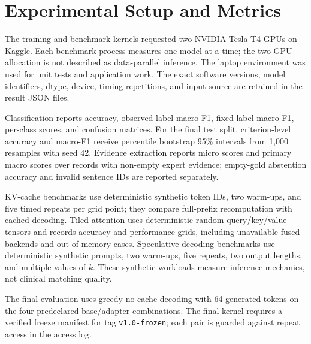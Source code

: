 \section{Experimental Setup and Metrics}
The training and benchmark kernels requested two NVIDIA Tesla T4 GPUs on Kaggle. Each benchmark process measures one model at a time; the two-GPU allocation is not described as data-parallel inference. The laptop environment was used for unit tests and application work. The exact software versions, model identifiers, dtype, device, timing repetitions, and input source are retained in the result JSON files.

Classification reports accuracy, observed-label macro-F1, fixed-label macro-F1, per-class scores, and confusion matrices. For the final test split, criterion-level accuracy and macro-F1 receive percentile bootstrap 95\% intervals from 1,000 resamples with seed 42. Evidence extraction reports micro scores and primary macro scores over records with non-empty expert evidence; empty-gold abstention accuracy and invalid sentence IDs are reported separately.

KV-cache benchmarks use deterministic synthetic token IDs, two warm-ups, and five timed repeats per grid point; they compare full-prefix recomputation with cached decoding. Tiled attention uses deterministic random query/key/value tensors and records accuracy and performance grids, including unavailable fused backends and out-of-memory cases. Speculative-decoding benchmarks use deterministic synthetic prompts, two warm-ups, five repeats, two output lengths, and multiple values of $k$. These synthetic workloads measure inference mechanics, not clinical matching quality.

The final evaluation uses greedy no-cache decoding with 64 generated tokens on the four predeclared base/adapter combinations. The final kernel requires a verified freeze manifest for tag \texttt{v1.0-frozen}; each pair is guarded against repeat access in the access log.
